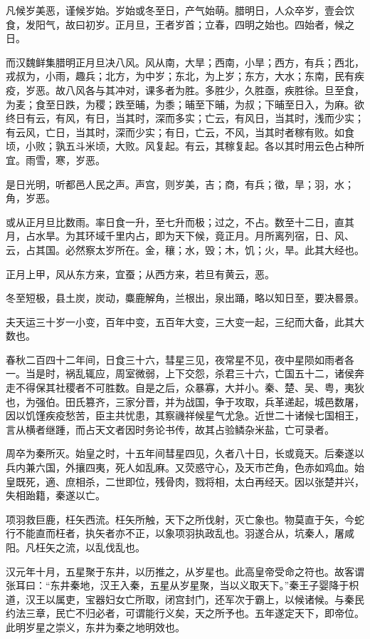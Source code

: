 \documentclass[]{article}
\begin{document}
凡候岁美恶，谨候岁始。岁始或冬至日，产气始萌。腊明日，人众卒岁，壹会饮食，发阳气，故曰初岁。正月旦，王者岁首；立春，四明之始也。四始者，候之日。

而汉魏鲜集腊明正月旦决八风。风从南，大旱；西南，小旱；西方，有兵；西北，戎叔为，小雨，趣兵；北方，为中岁；东北，为上岁；东方，大水；东南，民有疾疫，岁恶。故八风各与其冲对，课多者为胜。多胜少，久胜亟，疾胜徐。旦至食，为麦；食至日跌，为稷；跌至晡，为黍；晡至下晡，为叔；下晡至日入，为麻。欲终日有云，有风，有日，当其时，深而多实；亡云，有风日，当其时，浅而少实；有云风，亡日，当其时，深而少实；有日，亡云，不风，当其时者稼有败。如食顷，小败；孰五斗米顷，大败。风复起。有云，其稼复起。各以其时用云色占种所宜。雨雪，寒，岁恶。

是日光明，听都邑人民之声。声宫，则岁美，吉；商，有兵；徵，旱；羽，水；角，岁恶。

或从正月旦比数雨。率日食一升，至七升而极；过之，不占。数至十二日，直其月，占水旱。为其环域千里内占，即为天下候，竟正月。月所离列宿，日、风、云，占其国。必然察太岁所在。金，穰；水，毁；木，饥；火，旱。此其大经也。

正月上甲，风从东方来，宜蚕；从西方来，若旦有黄云，恶。

冬至短极，县土炭，炭动，麋鹿解角，兰根出，泉出踊，略以知日至，要决晷景。

夫天运三十岁一小变，百年中变，五百年大变，三大变一起，三纪而大备，此其大数也。

春秋二百四十二年间，日食三十六，彗星三见，夜常星不见，夜中星陨如雨者各一。当是时，祸乱辄应，周室微弱，上下交怨，杀君三十六，亡国五十二，诸侯奔走不得保其社稷者不可胜数。自是之后，众暴寡，大并小。秦、楚、吴、粤，夷狄也，为强伯。田氏篡齐，三家分晋，并为战国，争于攻取，兵革递起，城邑数屠，因以饥馑疾疫愁苦，臣主共忧患，其察禨祥候星气尤急。近世二十诸候七国相王，言从横者继踵，而占天文者因时务论书传，故其占验鳞杂米盐，亡可录者。

周卒为秦所灭。始皇之时，十五年间彗星四见，久者八十日，长或竟天。后秦遂以兵内兼六国，外攘四夷，死人如乱麻。又荧惑守心，及天市芒角，色赤如鸡血。始皇既死，適、庶相杀，二世即位，残骨肉，戮将相，太白再经天。因以张楚并兴，失相跆籍，秦遂以亡。

项羽救巨鹿，枉矢西流。枉矢所触，天下之所伐射，灭亡象也。物莫直于矢，今蛇行不能直而枉者，执矢者亦不正，以象项羽执政乱也。羽遂合从，坑秦人，屠咸阳。凡枉矢之流，以乱伐乱也。

汉元年十月，五星聚于东井，以历推之，从岁星也。此高皇帝受命之符也。故客谓张耳曰：``东井秦地，汉王入秦，五星从岁星聚，当以义取天下。''秦王子婴降于枳道，汉王以属吏，宝器妇女亡所取，闭宫封门，还军次于霸上，以候诸候。与秦民约法三章，民亡不归必者，可谓能行义矣，天之所予也。五年遂定天下，即帝位。此明岁星之崇义，东井为秦之地明效也。
\end{document}
